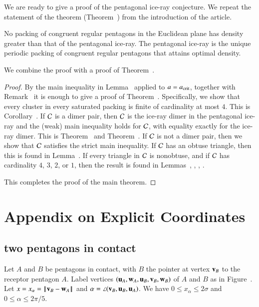We are ready to give a proof of the pentagonal ice-ray conjecture. We
repeat the statement of the theorem (Theorem~) from the
introduction of the article.

\begin{theorem}   
  No packing of congruent regular pentagons in the Euclidean plane has
  density greater than that of the pentagonal ice-ray.  The pentagonal
  ice-ray is the unique periodic packing of congruent regular
  pentagons that attains optimal density.
\end{theorem}

We combine the proof with a proof of Theorem~.

\begin{proof}
  By the main inequality in Lemma~ applied to
  $a=a_\text{crit}$, together with Remark~ it is enough to
  give a proof of Theorem~.  Specifically, we show that
  every cluster in every saturated packing is finite of cardinality at
  most $4$.  This is Corollary~.  If $\mathcal C$ is a dimer
  pair, then $\mathcal C$ is the ice-ray dimer in the pentagonal ice-ray and
  the (weak) main inequality holds for $\mathcal C$, with equality exactly for
  the ice-ray dimer.  This is Theorem~ and
  Theorem~.  If $\mathcal C$ is not a dimer pair, then we
  show that $\mathcal C$ satisfies the strict main inequality.  If $\mathcal C$ has an
  obtuse triangle, then this is found in Lemma~.  If
  every triangle in $\mathcal C$ is nonobtuse, and if $\mathcal C$ has cardinality
  $4$, $3$, $2$, or $1$, then the result is found in
  Lemmas~, , ,
  .

  This completes the proof of the main theorem.
\end{proof}



\section{Appendix on Explicit Coordinates}


\subsection{two pentagons in contact}

Let $A$ and $B$ be pentagons in contact, with $B$ the pointer at
vertex ${\mathbf v}_B$ to the receptor pentagon $A$.  Label vertices
$({\mathbf u}_A,{\mathbf w}_A,{\mathbf u}_B,{\mathbf v}_B,{\mathbf w}_B)$ of $A$ and $B$ as in
Figure~.  Let $x=x_\alpha=\norm{\v_B}{\w_A}$ and $\alpha
= \angle({\mathbf v}_B,{\mathbf u}_B,{\mathbf u}_A)$.  We have $0\le x_\alpha\le 2\sigma$ and
$0\le \alpha\le 2\pi/5$.

